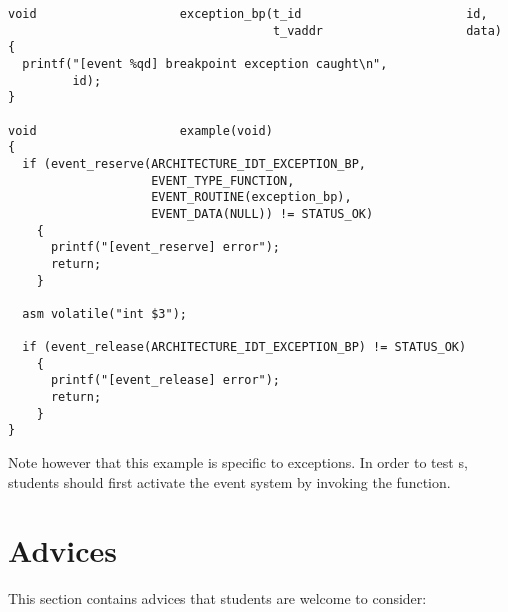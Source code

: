 \begin{verbatim}
void                    exception_bp(t_id                       id,
                                     t_vaddr                    data)
{
  printf("[event %qd] breakpoint exception caught\n",
         id);
}

void                    example(void)
{
  if (event_reserve(ARCHITECTURE_IDT_EXCEPTION_BP,
                    EVENT_TYPE_FUNCTION,
                    EVENT_ROUTINE(exception_bp),
                    EVENT_DATA(NULL)) != STATUS_OK)
    {
      printf("[event_reserve] error");
      return;
    }

  asm volatile("int $3");

  if (event_release(ARCHITECTURE_IDT_EXCEPTION_BP) != STATUS_OK)
    {
      printf("[event_release] error");
      return;
    }
}
\end{verbatim}

Note however that this example is specific to exceptions. In order to test
s, students should first activate the event system by invoking the
 function.

%
%

\section{Advices}

This section contains advices that students are welcome to consider:

